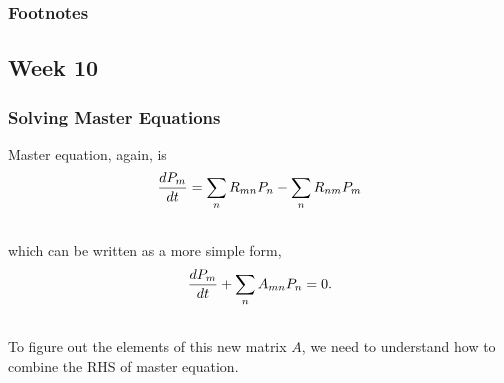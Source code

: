 \documentclass[letterpaper,10pt,english]{sphinxmanual}
\begin{document}
\subsubsection{Footnotes}
\label{nonequilibrium/week9:footnotes}

\subsection{Week 10}
\label{nonequilibrium/week10:week-10}\label{nonequilibrium/week10::doc}

\subsubsection{Solving Master Equations}
\label{nonequilibrium/week10:solving-master-equations}\label{nonequilibrium/week10:index-0}
Master equation, again, is
\begin{gather}
\begin{split}\frac{d P_m}{dt} = \sum_n R_{mn} P_n - \sum_n R_{nm} P_m\end{split}\notag\\\begin{split}\end{split}\notag
\end{gather}
which can be written as a more simple form,
\begin{gather}
\begin{split}\frac{d P_m}{dt} + \sum_n A_{mn}P_n = 0 .\end{split}\notag\\\begin{split}\end{split}\notag
\end{gather}
To figure out the elements of this new matrix $A$, we need to understand how to combine the RHS of master equation.
\end{document}
